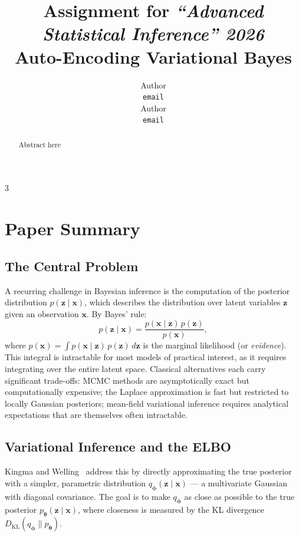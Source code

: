 \documentclass{article}
\title{Assignment for \emph{``Advanced Statistical Inference'' 2026}\\
Auto-Encoding Variational Bayes}
\author{%
  Author \\
  \texttt{email} \\
  \And
  Author \\
  \texttt{email} \\
}
\begin{document}
\maketitle

\begin{abstract}
Abstract here
\end{abstract}3

\section{Paper Summary}

\subsection{The Central Problem}

A recurring challenge in Bayesian inference is the computation of the posterior
distribution $p(\mathbf{z} \mid \mathbf{x})$, which describes the distribution
over latent variables $\mathbf{z}$ given an observation $\mathbf{x}$.
By Bayes' rule:
\[
  p(\mathbf{z} \mid \mathbf{x}) = \frac{p(\mathbf{x} \mid \mathbf{z})\, p(\mathbf{z})}{p(\mathbf{x})},
\]
where $p(\mathbf{x}) = \int p(\mathbf{x} \mid \mathbf{z})\, p(\mathbf{z})\, d\mathbf{z}$
is the marginal likelihood (or \emph{evidence}).
This integral is intractable for most models of practical interest, as it requires
integrating over the entire latent space.
Classical alternatives each carry significant trade-offs: MCMC methods are asymptotically
exact but computationally expensive; the Laplace approximation is fast but restricted
to locally Gaussian posteriors; mean-field variational inference requires analytical
expectations that are themselves often intractable.

\subsection{Variational Inference and the ELBO}

Kingma and Welling~\cite{kingma2013} address this by directly approximating the true
posterior with a simpler, parametric distribution $q_{\boldsymbol{\phi}}(\mathbf{z} \mid \mathbf{x})$
--- a multivariate Gaussian with diagonal covariance.
The goal is to make $q_{\boldsymbol{\phi}}$ as close as possible to the true posterior
$p_{\boldsymbol{\theta}}(\mathbf{z} \mid \mathbf{x})$, where closeness is measured by
the KL divergence $D_{\mathrm{KL}}(q_{\boldsymbol{\phi}} \| p_{\boldsymbol{\theta}})$.
\end{document}
